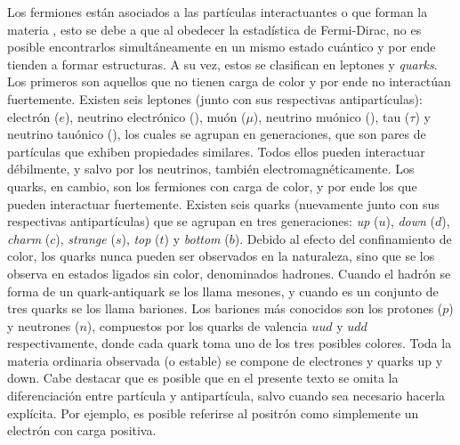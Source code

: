 Los fermiones están asociados a las partículas interactuantes o que forman la materia 
, esto se debe a que al obedecer la estadística de Fermi-Dirac, no es posible encontrarlos simultáneamente en un mismo estado cuántico y por ende tienden a formar estructuras. A su vez, estos se clasifican en leptones y \textit{quarks}. Los primeros son aquellos que no tienen carga de color y por ende no interactúan fuertemente. Existen seis leptones (junto con sus respectivas antipartículas): electrón ($e$), neutrino electrónico (\nue), muón ($\mu$), neutrino muónico (\numu), tau ($\tau$) y neutrino tauónico (\nutau), los cuales se agrupan en generaciones, que son pares de partículas que exhiben propiedades similares. Todos ellos pueden interactuar débilmente, y salvo por los neutrinos, también electromagnéticamente. Los quarks, en cambio, son los fermiones con carga de color, y por ende los que pueden interactuar fuertemente. Existen seis quarks (nuevamente junto con sus respectivas antipartículas) que se agrupan en tres generaciones: \textit{up} ($u$), \textit{down} ($d$), \textit{charm} ($c$), \textit{strange} ($s$), \textit{top} ($t$) y \textit{bottom} ($b$). Debido al efecto del confinamiento de color, los quarks nunca pueden ser observados en la naturaleza, sino que se los observa en estados ligados sin color, denominados hadrones. Cuando el hadrón se forma de un quark-antiquark se los llama mesones, y cuando es un conjunto de tres quarks se los llama bariones. Los bariones más conocidos son los protones ($p$) y neutrones ($n$), compuestos por los quarks de valencia $uud$ y $udd$ respectivamente, donde cada quark toma uno de los tres posibles colores. Toda la materia ordinaria observada (o estable) se compone de electrones y quarks up y down. Cabe destacar que es posible que en el presente texto se omita la diferenciación entre partícula y antipartícula, salvo cuando sea necesario hacerla explícita. Por ejemplo, es posible referirse al positrón como simplemente un electrón con carga positiva.

